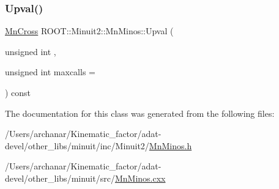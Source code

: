 \mbox{\label{classROOT_1_1Minuit2_1_1MnMinos_a6fb073e7f84cb2d038714e362eda732a}} 
\subsubsection{\texorpdfstring{Upval()}{Upval()}\hspace{0.1cm}{\footnotesize\ttfamily [3/3]}}
{\footnotesize\ttfamily \mbox{\hyperlink{classROOT_1_1Minuit2_1_1MnCross}{Mn\+Cross}} R\+O\+O\+T\+::\+Minuit2\+::\+Mn\+Minos\+::\+Upval (\begin{DoxyParamCaption}\item[{unsigned int}]{,  }\item[{unsigned int}]{maxcalls = {} }\end{DoxyParamCaption}) const}



The documentation for this class was generated from the following files\+:\begin{DoxyCompactItemize}
\item 
/\+Users/archanar/\+Kinematic\+\_\+factor/adat-\/devel/other\+\_\+libs/minuit/inc/\+Minuit2/\mbox{\hyperlink{adat-devel_2other__libs_2minuit_2inc_2Minuit2_2MnMinos_8h}{Mn\+Minos.\+h}}\item 
/\+Users/archanar/\+Kinematic\+\_\+factor/adat-\/devel/other\+\_\+libs/minuit/src/\mbox{\hyperlink{adat-devel_2other__libs_2minuit_2src_2MnMinos_8cxx}{Mn\+Minos.\+cxx}}\end{DoxyCompactItemize}
